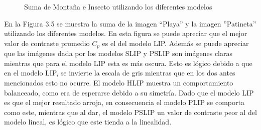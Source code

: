 \begin{figure}
\begin{center}
		\caption{Suma de Monta\~na e Insecto utilizando los diferentes modelos}
	\end{center}
\end{figure}

En la Figura 3.5 se muestra la suma de la imagen ``Playa'' y la imagen ''Patineta'' utilizando los diferentes modelos. En esta figura se puede apreciar que el mejor valor de contraste promedio $C_p$ es el del modelo LIP. Adem\'as se puede apreciar que las im\'agenes dada por los modelos SLIP y PSLIP son im\'agenes claras mientras que para el modelo LIP esta es m\'as oscura. Esto es l\'ogico debido a que en el modelo LIP, se invierte la escala de gris mientras que en los dos antes mencionados esto no ocurre. El modelo HLIP muestra un comportamiento balanceado, como era de esperarse debido a su simetr\'ia. Dado que el modelo LIP es que el mejor resultado arroja, en consecuencia el modelo PLIP se comporta como este, mientras que al dar, el modelo PSLIP un valor de contraste peor al del modelo lineal, es l\'ogico que este tienda a la linealidad.

